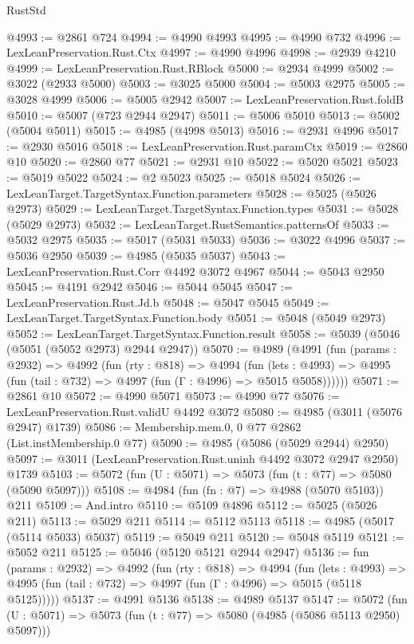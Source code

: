 \begin{lexlean}{RustStd}
\begin{coremodule}
@4993 := @2861 @724
@4994 := @4990 @4993
@4995 := @4990 @732
@4996 := LexLeanPreservation.Rust.Ctx
@4997 := @4990 @4996
@4998 := @2939 @4210
@4999 := LexLeanPreservation.Rust.RBlock
@5000 := @2934 @4999
@5002 := @3022 (@2933 @5000)
@5003 := @3025 @5000
@5004 := @5003 @2975
@5005 := @3028 @4999
@5006 := @5005 @2942
@5007 := LexLeanPreservation.Rust.foldB
@5010 := @5007 (@723 @2944 @2947)
@5011 := @5006 @5010
@5013 := @5002 (@5004 @5011)
@5015 := @4985 (@4998 @5013)
@5016 := @2931 @4996
@5017 := @2930 @5016
@5018 := LexLeanPreservation.Rust.paramCtx
@5019 := @2860 @10
@5020 := @2860 @77
@5021 := @2931 @10
@5022 := @5020 @5021
@5023 := @5019 @5022
@5024 := @2 @5023
@5025 := @5018 @5024
@5026 := LexLeanTarget.TargetSyntax.Function.parameters
@5028 := @5025 (@5026 @2973)
@5029 := LexLeanTarget.TargetSyntax.Function.types
@5031 := @5028 (@5029 @2973)
@5032 := LexLeanTarget.RustSemantics.patternsOf
@5033 := @5032 @2975
@5035 := @5017 (@5031 @5033)
@5036 := @3022 @4996
@5037 := @5036 @2950
@5039 := @4985 (@5035 @5037)
@5043 := LexLeanPreservation.Rust.Corr @4492 @3072 @4967
@5044 := @5043 @2950
@5045 := @4191 @2942
@5046 := @5044 @5045
@5047 := LexLeanPreservation.Rust.Jd.b
@5048 := @5047 @5045
@5049 := LexLeanTarget.TargetSyntax.Function.body
@5051 := @5048 (@5049 @2973)
@5052 := LexLeanTarget.TargetSyntax.Function.result
@5058 := @5039 (@5046 (@5051 (@5052 @2973) @2944 @2947))
@5070 := @4989
    (@4991
      (fun (params : @2932) =>
      @4992
        (fun (rty : @818) =>
        @4994
          (fun (lets : @4993) =>
          @4995 (fun (tail : @732) => @4997 (fun (Γ : @4996) => @5015 @5058))))))
@5071 := @2861 @10
@5072 := @4990 @5071
@5073 := @4990 @77
@5076 := LexLeanPreservation.Rust.validU @4492 @3072
@5080 := @4985 (@3011 (@5076 @2947) @1739)
@5086 := Membership.mem.{0, 0} @77 @2862 (List.instMembership.{0} @77)
@5090 := @4985 (@5086 (@5029 @2944) @2950)
@5097 := @3011 (LexLeanPreservation.Rust.uninh @4492 @3072 @2947 @2950) @1739
@5103 := @5072 (fun (U : @5071) => @5073 (fun (t : @77) => @5080 (@5090 @5097)))
@5108 := @4984 (fun (fn : @7) => @4988 (@5070 @5103)) @211
@5109 := And.intro
@5110 := @5109 @4896
@5112 := @5025 (@5026 @211)
@5113 := @5029 @211
@5114 := @5112 @5113
@5118 := @4985 (@5017 (@5114 @5033) @5037)
@5119 := @5049 @211
@5120 := @5048 @5119
@5121 := @5052 @211
@5125 := @5046 (@5120 @5121 @2944 @2947)
@5136 := fun (params : @2932) =>
  @4992
    (fun (rty : @818) =>
    @4994
      (fun (lets : @4993) =>
      @4995 (fun (tail : @732) => @4997 (fun (Γ : @4996) => @5015 (@5118 @5125)))))
@5137 := @4991 @5136
@5138 := @4989 @5137
@5147 := @5072 (fun (U : @5071) => @5073 (fun (t : @77) => @5080 (@4985 (@5086 @5113 @2950) @5097)))

\end{coremodule}
\end{lexlean}
